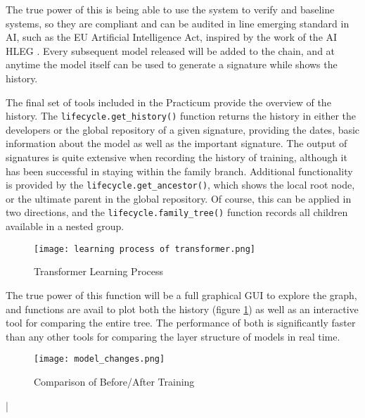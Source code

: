 The true power of this is being able to use the system to verify and baseline systems, so they are compliant and can be audited in line emerging standard in AI, such as the EU Artificial Intelligence Act, inspired by the work of the AI HLEG \cite{high-levelexpertgrouponaiEthicsGuidelinesTrustworthy2019}. Every subsequent model released will be added to the chain, and at anytime the model itself can be used to generate a signature while shows the history.

The final set of tools included in the Practicum provide the overview of the history. The \verb|lifecycle.get_history()| function returns the history in either the developers or the global repository of a given signature, providing the dates, basic information about the model as well as the important signature. The output of signatures is quite extensive when recording the history of training, although it has been successful in staying within the family branch. Additional functionality is provided by the \verb|lifecycle.get_ancestor()|, which shows the local root node, or the ultimate parent in the global repository. Of course, this can be applied in two directions, and the \verb|lifecycle.family_tree()| function records all children available in a nested group.

\begin{figure}[!ht]
    \centering
    \texttt{[image: learning process of transformer.png]}
    \caption{Transformer Learning Process}
    \label{fig:transformer}
\end{figure}

The true power of this function will be a full graphical GUI to explore the graph, and functions are avail to plot both the history (figure \ref{fig:transformer}) as well as an interactive tool for comparing the entire tree. The performance of both is significantly faster than any other tools for comparing the layer structure of models in real time.

\begin{figure}[!t]
    \centering
    \texttt{[image: model\_changes.png]}
    \caption{Comparison of Before/After Training}
    \label{fig:beforeafter}
\end{figure}|







